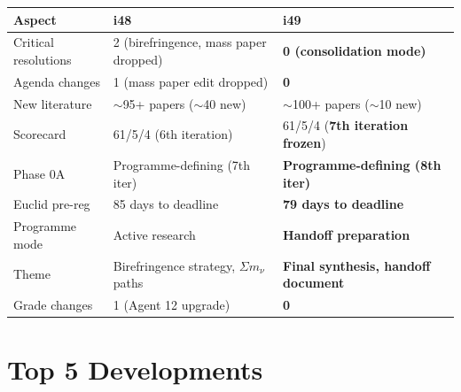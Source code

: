\documentclass[11pt,a4paper]{article}
\begin{document}
\begin{center}
\begin{tabular}{lll}
\toprule
\textbf{Aspect} & \textbf{i48} & \textbf{i49} \\
\midrule
Critical resolutions & 2 (birefringence, mass paper dropped) & \textbf{0 (consolidation mode)} \\
Agenda changes & 1 (mass paper edit dropped) & \textbf{0} \\
New literature & $\sim$95+ papers ($\sim$40 new) & $\sim$100+ papers ($\sim$10 new) \\
Scorecard & 61/5/4 (6th iteration) & 61/5/4 (\textbf{7th iteration frozen}) \\
Phase 0A & Programme-defining (7th iter) & \textbf{Programme-defining (8th iter)} \\
Euclid pre-reg & 85 days to deadline & \textbf{79 days to deadline} \\
Programme mode & Active research & \textbf{Handoff preparation} \\
Theme & Birefringence strategy, $\Sigma m_\nu$ paths & \textbf{Final synthesis, handoff document} \\
Grade changes & 1 (Agent 12 upgrade) & \textbf{0} \\
\bottomrule
\end{tabular}
\end{center}

\section{Top 5 Developments}
\end{document}

